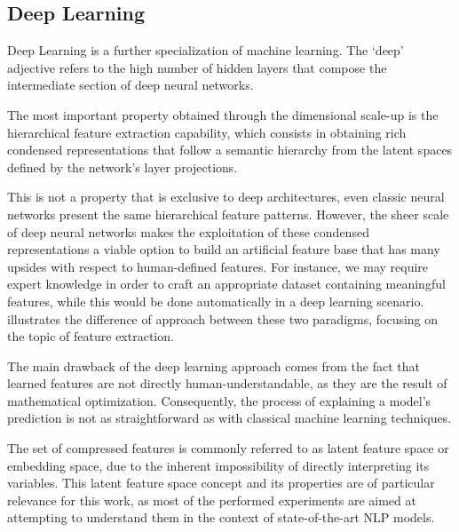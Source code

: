 \subsection{Deep Learning}

Deep Learning is a further specialization of machine learning.
The `deep' adjective refers to the high number of hidden layers that compose the intermediate section of deep neural networks.

The most important property obtained through the dimensional scale-up is the hierarchical feature extraction capability, which consists in obtaining rich condensed representations that follow a semantic hierarchy from the latent spaces defined by the network's layer projections.

\begin{figure}[t!]
    \centering
    \quad
    \caption{}
    \label{fig:background_fex_deep-fex}
\end{figure}

This is not a property that is exclusive to deep architectures, even classic neural networks present the same hierarchical feature patterns.
However, the sheer scale of deep neural networks makes the exploitation of these condensed representations a viable option to build an artificial feature base that has many upsides with respect to human-defined features.
For instance, we may require expert knowledge in order to craft an appropriate dataset containing meaningful features, while this would be done automatically in a deep learning scenario.
 illustrates the difference of approach between these two paradigms, focusing on the topic of feature extraction.

The main drawback of the deep learning approach comes from the fact that learned features are not directly human-understandable, as they are the result of mathematical optimization.
Consequently, the process of explaining a model's prediction is not as straightforward as with classical machine learning techniques.

The set of compressed features is commonly referred to as latent feature space or embedding space, due to the inherent impossibility of directly interpreting its variables.
This latent feature space concept and its properties are of particular relevance for this work, as most of the performed experiments are aimed at attempting to understand them in the context of state-of-the-art NLP models.

